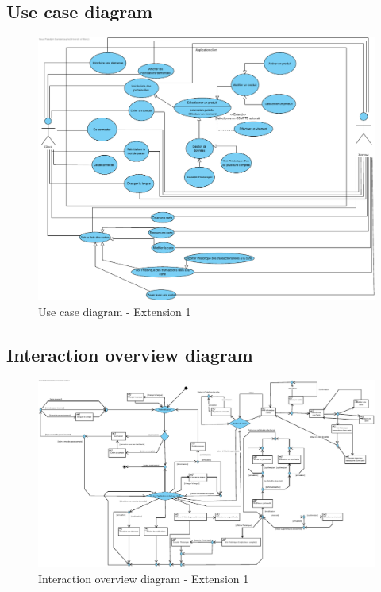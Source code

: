 \documentclass[]{report}
\begin{document}
\subsection{Use case diagram}
\begin{figure}[h]
	\centering\includegraphics[width=\linewidth]{img/use-case-Extension-1.pdf}
	\caption{Use case diagram - Extension 1}
\end{figure}




\newpage

\subsection{Interaction overview diagram}

\begin{figure}[h!]
	\centering\includegraphics[width=\linewidth]{img/iov-client-Extension-1.pdf}
	\caption{Interaction overview diagram - Extension 1}
\end{figure}
\end{document}
